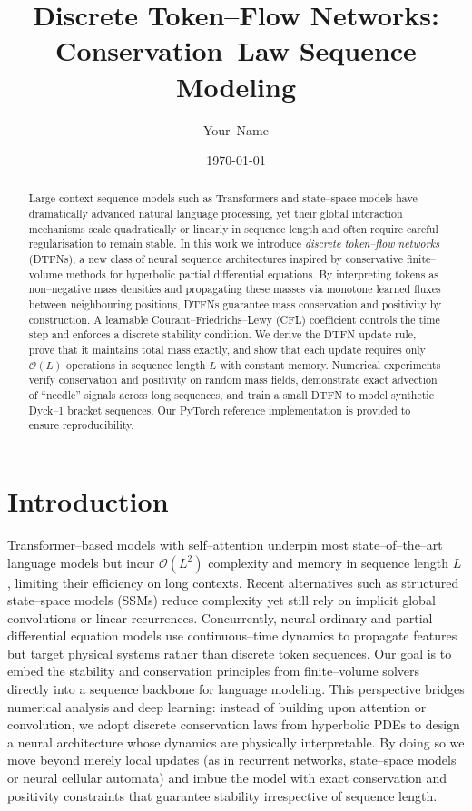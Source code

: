 \documentclass[10pt]{article}
\title{Discrete Token--Flow Networks: Conservation--Law Sequence Modeling}
\author{Your~Name}
\date{\today}
\begin{document}
\maketitle

\begin{abstract}
Large context sequence models such as Transformers and state--space models
have dramatically advanced natural language processing, yet their global
interaction mechanisms scale quadratically or linearly in sequence length and
often require careful regularisation to remain stable.  In this work we
introduce \emph{discrete token--flow networks} (DTFNs), a new class of
neural sequence architectures inspired by conservative finite--volume
methods for hyperbolic partial differential equations.  By interpreting
tokens as non--negative mass densities and propagating these masses via
monotone learned fluxes between neighbouring positions, DTFNs guarantee
mass conservation and positivity by construction.  A learnable
Courant--Friedrichs--Lewy (CFL) coefficient controls the time step and
enforces a discrete stability condition.  We derive the DTFN update rule,
prove that it maintains total mass exactly, and show that each update
requires only $\mathcal{O}(L)$ operations in sequence length $L$ with
constant memory.  Numerical experiments verify conservation and positivity
on random mass fields, demonstrate exact advection of ``needle'' signals
across long sequences, and train a small DTFN to model synthetic
Dyck--1 bracket sequences.  Our PyTorch reference implementation is
provided to ensure reproducibility.
\end{abstract}

\section{Introduction}

Transformer--based models with self--attention
\cite{vaswani2017attention} underpin most state--of--the--art language
models but incur $\mathcal{O}(L^2)$ complexity and memory in sequence
length $L$, limiting their efficiency on long contexts.  Recent
alternatives such as structured state--space models (SSMs)
\cite{gu2022combining,gu2022efficiently} reduce complexity yet still rely
on implicit global convolutions or linear recurrences.  Concurrently,
neural ordinary and partial differential equation models
\cite{raissi2019physics,mordvintsev2020growing} use continuous--time
 dynamics to propagate features but target physical systems rather than
 discrete token sequences.  Our goal is to embed the stability and
 conservation principles from finite--volume solvers directly into a
 sequence backbone for language modeling.  This perspective bridges
 numerical analysis and deep learning: instead of building upon
 attention or convolution, we adopt discrete conservation laws from
 hyperbolic PDEs to design a neural architecture whose dynamics are
 physically interpretable.  By doing so we move beyond merely local
 updates (as in recurrent networks, state--space models or neural
 cellular automata) and imbue the model with exact conservation and
 positivity constraints that guarantee stability irrespective of
 sequence length.
\end{document}
